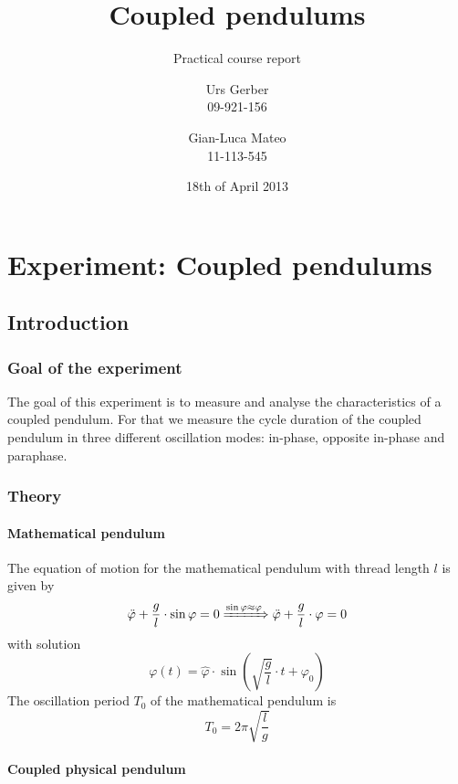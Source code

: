 \documentclass{scrreprt}
\author{Urs Gerber\\09-921-156 \and Gian-Luca Mateo\\11-113-545}
\date{18th of April 2013}
\title{Coupled pendulums}
\subtitle{Practical course report}
\renewcommand{\phi}{\varphi}
\begin{document}
\maketitle

\tableofcontents
\newpage

\chapter{Experiment: Coupled pendulums}

\section{Introduction}

\subsection{Goal of the experiment}
The goal of this experiment is to measure and analyse the characteristics of a coupled pendulum. For that we measure the cycle duration of the coupled pendulum in three different oscillation modes: in-phase, opposite in-phase and paraphase.

\subsection{Theory}

\subsubsection{Mathematical pendulum}
The equation of motion for the mathematical pendulum with thread length $l$ is given by
\begin{equation}
\ddot{\phi} + \frac{g}{l} \cdot \sin{\phi} = 0 \xRightarrow{\sin{\phi}\approx\phi} \ddot{\phi} + \frac{g}{l} \cdot \phi = 0
\end{equation}
with solution 
\begin{equation}
\phi (t) = \hat{\phi} \cdot \sin{\left( \sqrt{\frac{g}{l}} \cdot t + \phi_0 \right)} 
\end{equation}
The oscillation period $T_0$ of the mathematical pendulum is
\begin{equation}
T_0 = 2 \pi \sqrt{\frac{l}{g	}}
\end{equation}

\subsubsection{Coupled physical pendulum}
\end{document}
